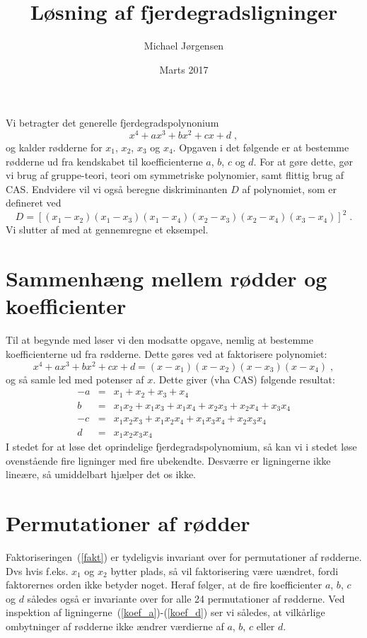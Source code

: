 \documentclass[12pt,oneside,a4paper]{article}
\title{Løsning af fjerdegradsligninger}
\date{Marts 2017}
\author{Michael Jørgensen}
\newcommand{\bea}{\begin{eqnarray}}
\newcommand{\eea}{\end{eqnarray}}
\begin{document}
\maketitle
Vi betragter det generelle fjerdegradspolynonium
\begin{equation}
x^4 + ax^3 + bx^2 + cx + d\;,
\label{eq_4}
\end{equation}
og kalder rødderne for $x_1$, $x_2$, $x_3$ og $x_4$.
Opgaven i det følgende er at bestemme rødderne ud fra kendskabet til
koefficienterne $a$, $b$, $c$ og $d$.
For at gøre dette, gør vi brug af gruppe-teori, teori om
symmetriske polynomier, samt flittig brug af CAS.
Endvidere vil vi også beregne diskriminanten $D$ af polynomiet, som 
er defineret ved
\begin{equation}
    D =
    \left[(x_1-x_2)(x_1-x_3)(x_1-x_4)(x_2-x_3)(x_2-x_4)(x_3-x_4)\right]^2\;.
    \label{eq_dis4}
\end{equation}
Vi slutter af med at gennemregne et eksempel.

\section{Sammenhæng mellem rødder og koefficienter}
Til at begynde med løser vi den modsatte opgave, nemlig at bestemme
koefficienterne ud fra rødderne. Dette gøres ved at faktorisere polynomiet:
\begin{equation}
    x^4 + ax^3 + bx^2 + cx + d = (x-x_1)(x-x_2)(x-x_3)(x-x_4)\;,
    \label{fakt}
\end{equation}
og så samle led med potenser af $x$.
Dette giver (vha CAS) følgende resultat:
\bea
  -a &=& x_1 + x_2 + x_3 + x_4 \label{koef_a} \\
   b &=& x_1x_2 + x_1x_3 + x_1x_4 + x_2x_3 + x_2x_4 + x_3x_4  \label{koef_b}\\
  -c &=& x_1x_2x_3 + x_1x_2x_4 + x_1x_3x_4 + x_2x_3x_4  \label{koef_c}\\
   d &=& x_1x_2x_3x_4 \label{koef_d}
\eea
I stedet for at løse det oprindelige fjerdegradspolynomium, så kan vi i stedet løse ovenstående fire ligninger med fire ubekendte. Desværre er ligningerne ikke lineære, så umiddelbart hjælper det os ikke.

\section{Permutationer af rødder}
Faktoriseringen~(\ref{fakt}) er tydeligvis invariant over for permutationer af
rødderne. Dvs hvis f.eks. $x_1$ og $x_2$ bytter plads, så vil faktorisering være
uændret, fordi faktorernes orden ikke betyder noget.
Heraf følger, at de fire koefficienter $a$, $b$, $c$ og $d$ således også er
invariante over for alle 24 permutationer af rødderne. Ved inspektion af
ligningerne~(\ref{koef_a})-(\ref{koef_d}) ser vi således, at vilkårlige
ombytninger af rødderne ikke ændrer værdierne af $a$, $b$, $c$ eller $d$.
\end{document}
